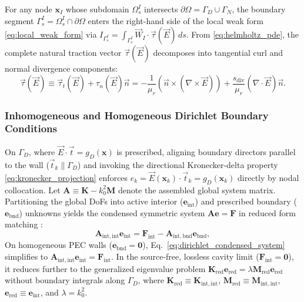 \documentclass[VANCOUVER]{USG}
\begin{document}
For any node $\mathbf{x}_I$ whose subdomain $\Omega_s^I$ intersects $\partial\Omega = \Gamma_D \cup \Gamma_N$, the boundary segment $\Gamma_s^I = \Omega_s^I \cap \partial\Omega$ enters the right-hand side of the local weak form \eqref{eq:local_weak_form} via $I_{\Gamma_s^I} = \int_{\Gamma_s^I} \vec{W}_I \cdot \vec{\tau}(\vec{E}) \, ds$. From \eqref{eq:helmholtz_pde}, the complete natural traction vector $\vec{\tau}(\vec{E})$ decomposes into tangential curl and normal divergence components:
\begin{equation}
    \vec{\tau}(\vec{E}) \equiv \vec{\tau}_t(\vec{E}) + \tau_n(\vec{E})\vec{n} = -\frac{1}{\mu_r} \left( \vec{n} \times (\nabla \times \vec{E}) \right) + \frac{s_{\mathrm{div}}}{\mu_r} (\nabla \cdot \vec{E}) \vec{n}.
    \label{eq:traction_vector}
\end{equation}

\subsubsection{Inhomogeneous and Homogeneous Dirichlet Boundary Conditions}
\label{subsubsec:dirichlet_bc}

On $\Gamma_D$, where $\vec{E} \cdot \vec{t} = g_D(\mathbf{x})$ is prescribed, aligning boundary directors parallel to the wall ($\vec{t}_k \parallel \Gamma_D$) and invoking the directional Kronecker-delta property \eqref{eq:kronecker_projection} enforces $e_k = \vec{E}(\mathbf{x}_k) \cdot \vec{t}_k = g_D(\mathbf{x}_k)$ directly by nodal collocation. Let $\mathbf{A} \equiv \mathbf{K} - k_0^2 \mathbf{M}$ denote the assembled global system matrix. Partitioning the global DoFs into active interior ($\mathbf{e}_{\mathrm{int}}$) and prescribed boundary ($\mathbf{e}_{\mathrm{bnd}}$) unknowns yields the condensed symmetric system $\mathbf{A}\mathbf{e} = \mathbf{F}$ in reduced form matching \cite{stable_vnmm2d_2026}:
\begin{equation}
    \mathbf{A}_{\mathrm{int}, \mathrm{int}} \mathbf{e}_{\mathrm{int}} = \mathbf{F}_{\mathrm{int}} - \mathbf{A}_{\mathrm{int}, \mathrm{bnd}} \mathbf{e}_{\mathrm{bnd}},
    \label{eq:dirichlet_condensed_system}
\end{equation}
On homogeneous PEC walls ($\mathbf{e}_{\mathrm{bnd}} = \mathbf{0}$), Eq.~\eqref{eq:dirichlet_condensed_system} simplifies to $\mathbf{A}_{\mathrm{int}, \mathrm{int}} \mathbf{e}_{\mathrm{int}} = \mathbf{F}_{\mathrm{int}}$. In the source-free, lossless cavity limit ($\mathbf{F}_{\mathrm{int}} = \mathbf{0}$), it reduces further to the generalized eigenvalue problem $\mathbf{K}_{\mathrm{red}} \mathbf{e}_{\mathrm{red}} = \lambda \mathbf{M}_{\mathrm{red}} \mathbf{e}_{\mathrm{red}}$ without boundary integrals along $\Gamma_D$, where $\mathbf{K}_{\mathrm{red}} \equiv \mathbf{K}_{\mathrm{int},\mathrm{int}}$, $\mathbf{M}_{\mathrm{red}} \equiv \mathbf{M}_{\mathrm{int},\mathrm{int}}$, $\mathbf{e}_{\mathrm{red}} \equiv \mathbf{e}_{\mathrm{int}}$, and $\lambda = k_0^2$.
\end{document}
